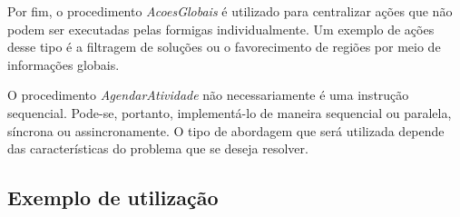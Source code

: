 Por fim, o procedimento \textit{AcoesGlobais} é utilizado para centralizar ações que não podem ser executadas
pelas formigas individualmente. Um exemplo de ações desse tipo é a filtragem de soluções ou o favorecimento de
regiões por meio de informações globais.

O procedimento \textit{AgendarAtividade} não necessariamente é uma instrução sequencial. Pode-se, portanto,
implementá-lo de maneira sequencial ou paralela, síncrona ou assincronamente. O tipo de abordagem que será
utilizada depende das características do problema que se deseja resolver.

\subsection{Exemplo de utilização}

